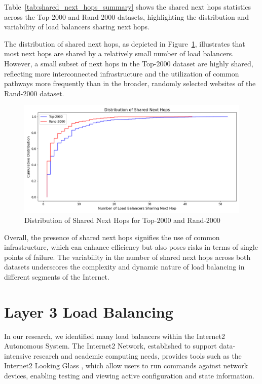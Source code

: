 \documentclass[12pt]{cwru_thesis}
\begin{document}
Table~\ref{tab:shared_next_hops_summary} shows the shared next hops statistics across the Top-2000 and Rand-2000 datasets, highlighting the distribution and variability of load balancers sharing next hops.



The distribution of shared next hops, as depicted in Figure~\ref{fig:shared_next_hops_combined}, illustrates that most next hops are shared by a relatively small number of load balancers. However, a small subset of next hops in the Top-2000 dataset are highly shared, reflecting more interconnected infrastructure and the utilization of common pathways more frequently than in the broader, randomly selected websites of the Rand-2000 dataset.


\begin{figure}[h!]
    \centering
    \includegraphics[width=\linewidth]{figures/shared_next_hops_combined.png}
    \caption{Distribution of Shared Next Hops for Top-2000 and Rand-2000}
    \label{fig:shared_next_hops_combined}
\end{figure}

Overall, the presence of shared next hops signifies the use of common infrastructure, which can enhance efficiency but also poses risks in terms of single points of failure. The variability in the number of shared next hops across both datasets underscores the complexity and dynamic nature of load balancing in different segments of the Internet.


\chapter{Layer 3 Load Balancing}

In our research, we identified many load balancers within the Internet2 Autonomous System. The Internet2 Network, established to support data-intensive research and academic computing needs, provides tools such as the Internet2 Looking Glass \cite{internet2_looking_glass}, which allow users to run commands against network devices, enabling testing and viewing active configuration and state information.
\end{document}
